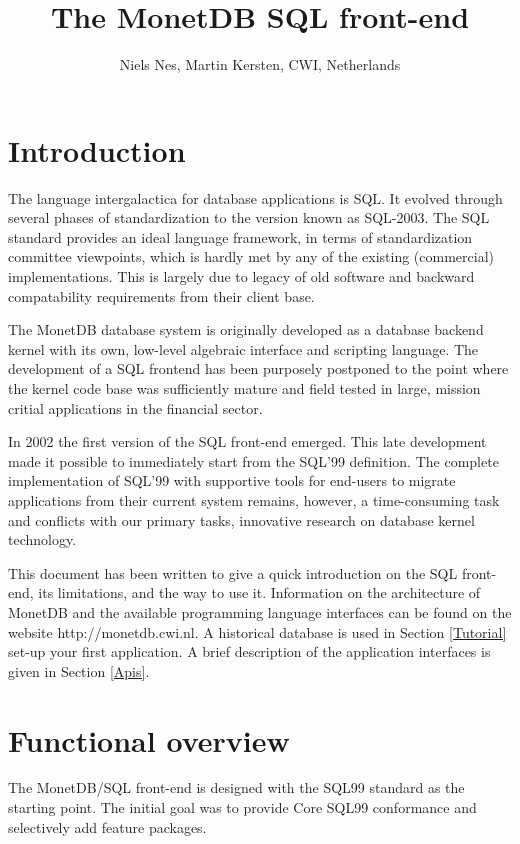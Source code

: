 \documentclass[10pt,twocolumn,fleqn]{article}
\begin{document}
\title{The MonetDB SQL front-end}
\author{ Niels Nes, Martin Kersten, {\small \textsc{CWI}, Netherlands}}
\date{}
\maketitle

\section{Introduction}
The language intergalactica for database applications is SQL. It evolved
through several phases of standardization to the version known as SQL-2003.
The SQL standard provides an ideal language framework, 
in terms of standardization committee viewpoints, 
which is hardly met by any of the existing (commercial) implementations.
This is largely due to legacy of old software and backward compatability
requirements from their client base.
 
The MonetDB database system is originally developed as a database backend
kernel with its own, low-level algebraic interface and scripting language.
The development of a SQL frontend has been purposely postponed to the point
where the kernel code base was sufficiently mature and field tested in
large, mission critial applications in the financial sector.

In 2002 the first version of the SQL front-end emerged. 
This late development made it possible to immediately start from the SQL'99
definition. The complete implementation of SQL'99 with supportive
tools for end-users to migrate applications from their current system
remains, however, a time-consuming task and conflicts with our primary tasks,
innovative research on database kernel technology.

This document has been written to give a quick introduction on the SQL
front-end, its limitations, and the way to use it. 
Information on the architecture of MonetDB and the available programming
language interfaces can be found on the website http://monetdb.cwi.nl.
A historical database is used in Section \ref{Tutorial}
set-up your first application.
A brief description of the application interfaces is given in Section \ref{Apis}.

\section{Functional overview}
\label{Functionality}
The MonetDB/SQL front-end is designed with the SQL99 standard as the starting
point. The initial goal was to provide Core SQL99 conformance and
selectively add feature packages.
\end{document}
